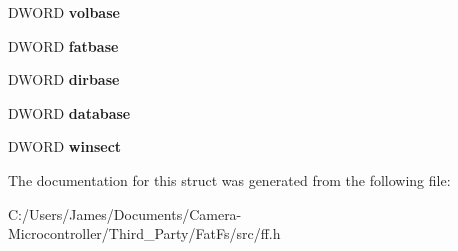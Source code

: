 \begin{DoxyCompactItemize}
\mbox{\label{struct_f_a_t_f_s_a3e3472628262823af495681702709e8e}} 
D\+W\+O\+RD {\bfseries volbase}
\item 
\mbox{\label{struct_f_a_t_f_s_a74e60540a346de6eb9f0c13d6203efa1}} 
D\+W\+O\+RD {\bfseries fatbase}
\item 
\mbox{\label{struct_f_a_t_f_s_aebfa6556d8f94e951a8b2c1eb740e9a1}} 
D\+W\+O\+RD {\bfseries dirbase}
\item 
\mbox{\label{struct_f_a_t_f_s_a112ba7d33529e5c9fda3b950fff01180}} 
D\+W\+O\+RD {\bfseries database}
\item 
\mbox{\label{struct_f_a_t_f_s_a285dc1de6874bb5f0c41c328c9433e14}} 
D\+W\+O\+RD {\bfseries winsect}
\end{DoxyCompactItemize}


The documentation for this struct was generated from the following file\+:\begin{DoxyCompactItemize}
\item 
C\+:/\+Users/\+James/\+Documents/\+Camera-\/\+Microcontroller/\+Third\+\_\+\+Party/\+Fat\+Fs/src/ff.\+h\end{DoxyCompactItemize}
